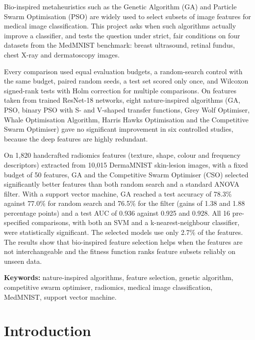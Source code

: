 \documentclass[12pt,a4paper]{report}
\begin{document}
Bio-inspired metaheuristics such as the Genetic Algorithm (GA) and Particle Swarm Optimisation (PSO) are widely
used to select subsets of image features for medical image classification. This project asks when such algorithms
actually improve a classifier, and tests the question under strict, fair conditions on four datasets from the
MedMNIST benchmark: breast ultrasound, retinal fundus, chest X-ray and dermatoscopy images.

Every comparison used equal evaluation budgets, a random-search control with the same budget, paired random seeds,
a test set scored only once, and Wilcoxon signed-rank tests with Holm correction for multiple comparisons. On
features taken from trained ResNet-18 networks, eight nature-inspired algorithms (GA, PSO, binary PSO with S- and
V-shaped transfer functions, Grey Wolf Optimiser, Whale Optimisation Algorithm, Harris Hawks Optimisation and the
Competitive Swarm Optimiser) gave no significant improvement in six controlled studies, because the deep features
are highly redundant.

On 1,820 handcrafted radiomics features (texture, shape, colour and frequency descriptors) extracted from 10,015
DermaMNIST skin-lesion images, with a fixed budget of 50 features, GA and the Competitive Swarm Optimiser (CSO)
selected significantly better features than both random search and a standard ANOVA filter. With a support vector
machine, GA reached a test accuracy of 78.3\% against 77.0\% for random search and 76.5\% for the filter (gains of
1.38 and 1.88 percentage points) and a test AUC of 0.936 against 0.925 and 0.928. All 16 pre-specified comparisons,
with both an SVM and a k-nearest-neighbour classifier, were statistically significant. The selected models use only
2.7\% of the features. The results show that bio-inspired feature selection helps when the features are not
interchangeable and the fitness function ranks feature subsets reliably on unseen data.

\vspace{0.4cm}
\noindent\textbf{Keywords:} nature-inspired algorithms, feature selection, genetic algorithm, competitive swarm
optimiser, radiomics, medical image classification, MedMNIST, support vector machine.

\newpage
\pagestyle{chapterstyle}

\chapter{Introduction}
\end{document}
